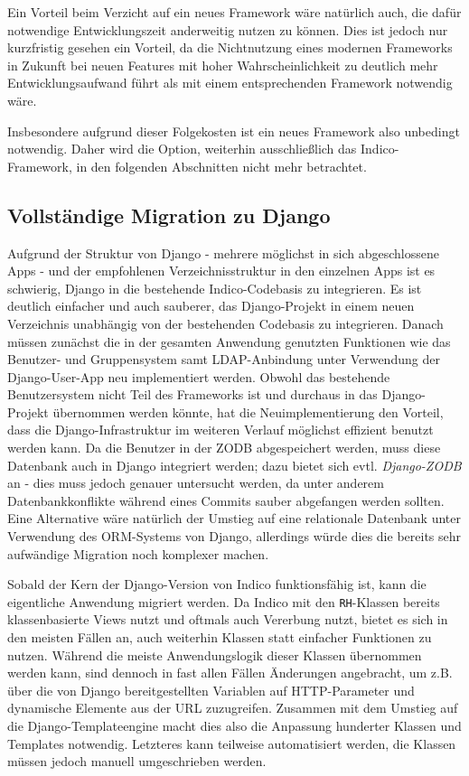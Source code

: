 Ein Vorteil beim Verzicht auf ein neues Framework wäre natürlich auch, die dafür notwendige
Entwicklungszeit anderweitig nutzen zu können. Dies ist jedoch nur kurzfristig gesehen ein Vorteil,
da die Nichtnutzung eines modernen Frameworks in Zukunft bei neuen Features mit hoher
Wahrscheinlichkeit zu deutlich mehr Entwicklungsaufwand führt als mit einem entsprechenden Framework
notwendig wäre.

Insbesondere aufgrund dieser Folgekosten ist ein neues Framework also unbedingt notwendig. Daher
wird die Option, weiterhin ausschließlich das Indico-Framework, in den folgenden Abschnitten nicht
mehr betrachtet.


\subsection{Vollständige Migration zu Django}
Aufgrund der Struktur von Django - mehrere möglichst in sich abgeschlossene Apps - und der
empfohlenen Verzeichnisstruktur in den einzelnen Apps ist es schwierig, Django in die bestehende
Indico-Codebasis zu integrieren. Es ist deutlich einfacher und auch sauberer, das Django-Projekt in
einem neuen Verzeichnis unabhängig von der bestehenden Codebasis zu integrieren. Danach müssen
zunächst die in der gesamten Anwendung genutzten Funktionen wie das Benutzer- und
Gruppensystem samt LDAP-Anbindung unter Verwendung der Django-User-App neu implementiert werden.
Obwohl das bestehende Benutzersystem nicht Teil des Frameworks ist und durchaus in
das Django-Projekt übernommen werden könnte, hat die Neuimplementierung den Vorteil, dass die
Django-Infrastruktur im weiteren Verlauf möglichst effizient benutzt werden kann. Da die Benutzer in
der ZODB abgespeichert werden, muss diese Datenbank auch in Django integriert werden; dazu bietet
sich evtl. \emph{Django-ZODB} an - dies muss jedoch genauer untersucht werden, da unter
anderem Datenbankkonflikte während eines Commits sauber abgefangen werden sollten. Eine Alternative
wäre natürlich der Umstieg auf eine relationale Datenbank unter Verwendung des ORM-Systems von
Django, allerdings würde dies die bereits sehr aufwändige Migration noch komplexer machen.

Sobald der Kern der Django-Version von Indico funktionsfähig ist, kann die eigentliche Anwendung
migriert werden. Da Indico mit den \lstinline{RH}-Klassen bereits klassenbasierte Views nutzt und
oftmals auch Vererbung nutzt, bietet es sich in den meisten Fällen an, auch weiterhin Klassen statt
einfacher Funktionen zu nutzen. Während die meiste Anwendungslogik dieser Klassen übernommen werden
kann, sind dennoch in fast allen Fällen Änderungen angebracht, um z.B. über die von Django
bereitgestellten Variablen auf HTTP-Parameter und dynamische Elemente aus der URL zuzugreifen.
Zusammen mit dem Umstieg auf die Django-Templateengine macht dies also die Anpassung hunderter
Klassen und Templates notwendig. Letzteres kann teilweise automatisiert werden, die Klassen müssen
jedoch manuell umgeschrieben werden.

